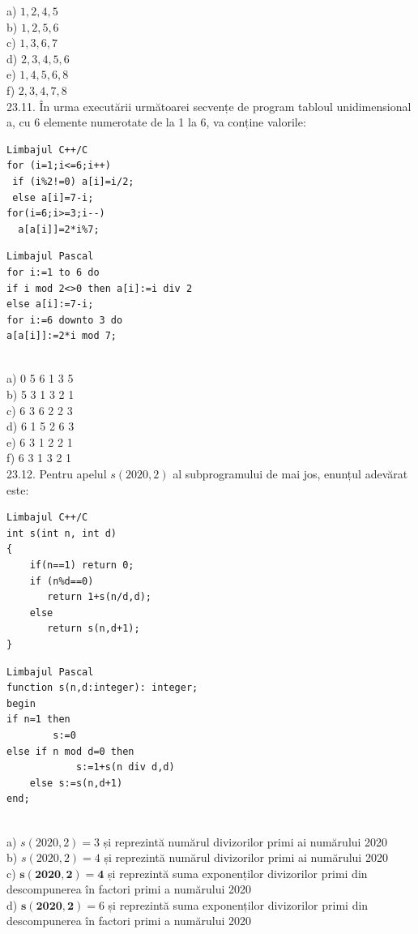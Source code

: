 {{a) $1,2,4,5$
\\
b) $1,2,5,6$
\\
c) $1,3,6,7$
\\
d) $2,3,4,5,6$
\\
e) $1,4,5,6,8$
\\
f) $2,3,4,7,8$
\\
23.11. În urma executării următoarei secvențe de program tabloul unidimensional a, cu 6 elemente numerotate de la 1 la 6, va conține valorile:
\begin{verbatim}
Limbajul C++/C 
for (i=1;i<=6;i++) 
 if (i%2!=0) a[i]=i/2; 
 else a[i]=7-i; 
for(i=6;i>=3;i--) 
  a[a[i]]=2*i%7;
\end{verbatim}
\begin{verbatim}
Limbajul Pascal 
for i:=1 to 6 do 
if i mod 2<>0 then a[i]:=i div 2 
else a[i]:=7-i; 
for i:=6 downto 3 do  
a[a[i]]:=2*i mod 7;
\end{verbatim}
\\
a) 0 5 6 1 3 5
\\
b) 5 3 1 3 2 1
\\
c) 6 3 6 2 2 3
\\
d) 6 1 5 2 6 3
\\
e) 6 3 1 2 2 1
\\
f) 6 3 1 3 2 1
\\
23.12. Pentru apelul $s(2020,2)$ al subprogramului de mai jos, enunțul adevărat este:
\begin{verbatim}
Limbajul C++/C 
int s(int n, int d) 
{ 
    if(n==1) return 0; 
    if (n%d==0) 
       return 1+s(n/d,d); 
    else  
       return s(n,d+1); 
}
\end{verbatim}
\begin{verbatim}
Limbajul Pascal
function s(n,d:integer): integer;
begin
if n=1 then
        s:=0
else if n mod d=0 then
            s:=1+s(n div d,d)
    else s:=s(n,d+1)
end;
\end{verbatim}
\\
a) $s(2020,2)=3$ și reprezintă numărul divizorilor primi ai numărului 2020
\\
b) $s(2020,2)=4$ și reprezintă numărul divizorilor primi ai numărului 2020
\\
c) $\mathbf{s}(\mathbf{2 0 2 0}, \mathbf{2})=\mathbf{4}$ și reprezintă suma exponenților divizorilor primi din descompunerea în factori primi a numărului 2020
\\
d) $\mathbf{s}(\mathbf{2 0 2 0}, \mathbf{2})=6$ și reprezintă suma exponenților divizorilor primi din descompunerea în factori primi a numărului 2020
\\
}}
